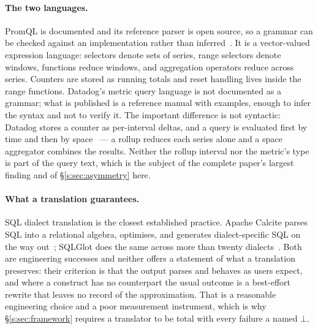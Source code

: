 \paragraph{The two languages.}
PromQL is documented and its reference parser is open source, so a grammar can be checked
against an implementation rather than inferred~\citep{promql}. It is a vector-valued
expression language: selectors denote sets of series, range selectors denote windows,
functions reduce windows, and aggregation operators reduce across series. Counters are
stored as running totals and reset handling lives inside the range functions. Datadog's
metric query language is not documented as a grammar; what is published is a reference
manual with examples, enough to infer the syntax and not to verify it. The important
difference is not syntactic: Datadog stores a counter as per-interval deltas, and a query
is evaluated first by time and then by space~\citep{datadog,ddnested} --- a rollup reduces
each series alone and a space aggregator combines the results. Neither the rollup interval
nor the metric's type is part of the query text, which is the subject of the complete
paper's largest finding and of \S\ref{s:sec:asymmetry} here.

\paragraph{What a translation guarantees.}
SQL dialect translation is the closest established practice. Apache Calcite parses SQL
into a relational algebra, optimises, and generates dialect-specific SQL on the way
out~\citep{begoli2018}; SQLGlot does the same across more than twenty
dialects~\citep{sqlglot}. Both are engineering successes and neither offers a statement of
what a translation preserves: their criterion is that the output parses and behaves as
users expect, and where a construct has no counterpart the usual outcome is a best-effort
rewrite that leaves no record of the approximation. That is a reasonable engineering choice
and a poor measurement instrument, which is why \S\ref{s:sec:framework} requires a
translator to be total with every failure a named $\bot$.

